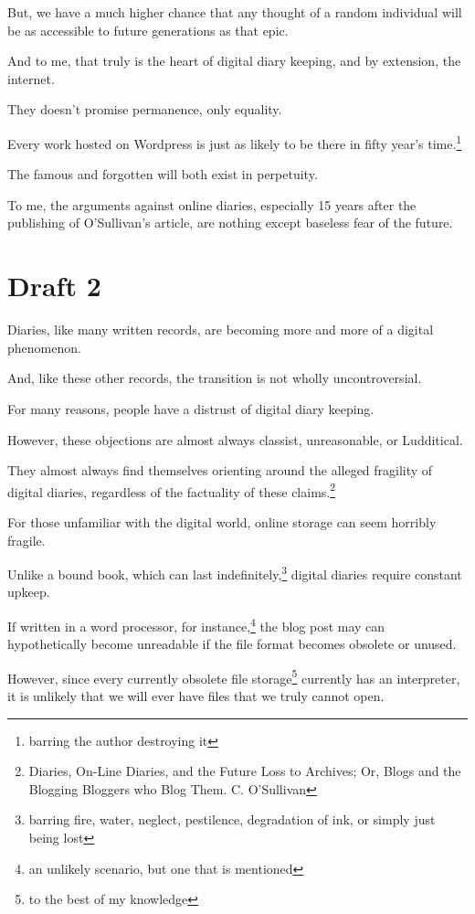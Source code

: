 \documentclass[12pt]{article}[titlepage]
\newcommand{\1}{\={a}}
\newcommand{\2}{\={e}}
\newcommand{\3}{\={\i}}
\newcommand{\4}{\=o}
\newcommand{\5}{\=u}
\newcommand{\6}{\={A}}
\renewcommand{\,}{\textsuperscript{,}}
\begin{document}
But, we have a much higher chance that any thought of a random individual will be as accessible to future generations as that epic.


And to me, that truly is the heart of digital diary keeping, and by extension, the internet.

They doesn’t promise permanence, only equality.

Every work hosted on Wordpress is just as likely to be there in fifty year’s time.\footnote{barring the author destroying it}

The famous and forgotten will both exist in perpetuity.

To me, the arguments against online diaries, especially 15 years after the publishing of O’Sullivan’s article, are nothing except baseless fear of the future.


\section{Draft 2}

Diaries, like many written records, are becoming more and more of a digital phenomenon.

And, like these other records, the transition is not wholly uncontroversial.

For many reasons, people have a distrust of digital diary keeping.

However, these objections are almost always classist, unreasonable, or Ludditical.

They almost always find themselves orienting around the alleged fragility of digital diaries, regardless of the factuality of these claims.\footnote{Diaries, On-Line Diaries, and the Future Loss to Archives; Or, Blogs and the Blogging Bloggers who Blog Them. C. O’Sullivan}


For those unfamiliar with the digital world, online storage can seem horribly fragile.

Unlike a bound book, which can last indefinitely,\footnote{barring fire, water, neglect, pestilence, degradation of ink, or simply just being lost} digital diaries require constant upkeep.

If written in a word processor, for instance,\footnote{an unlikely scenario, but one that is mentioned} the blog post may can hypothetically become unreadable if the file format becomes obsolete or unused.

However, since every currently obsolete file storage\footnote{to the best of my knowledge} currently has an interpreter, it is unlikely that we will ever have files that we truly cannot open.
\end{document}
